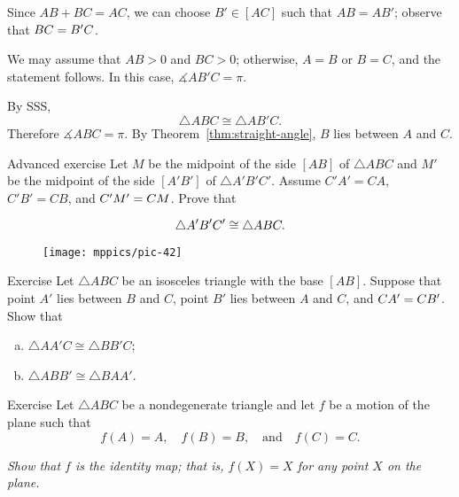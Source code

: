 Since $AB+BC=AC$, we can choose $B'\in [AC]$ such that $AB=AB'$;
observe that $BC\z=B'C$.

We may assume that $AB>0$ and $BC>0$;
otherwise, $A=B$ or $B=C$, and the statement follows.
In this case, $\measuredangle AB'C=\pi$.

By SSS, 
\[\triangle ABC\cong \triangle AB'C.\]
Therefore $\measuredangle ABC=\pi$.
By Theorem~\ref{thm:straight-angle}, $B$ lies between $A$ and $C$.
\qeds



\begin{thm}{Advanced exercise}\label{ex:SMS}
Let $M$ be the midpoint of the side $[A B]$ of $\triangle A B C$ and
$M'$ be the midpoint of the side $[A' B']$ of $\triangle A' B' C'$.
Assume $C' A'=C A$, $C' B'= C B$, and $C' M'\z= C M$.
Prove that

\[\triangle A' B' C'\z\cong\triangle A B C.\]

\end{thm}

{

\begin{wrapfigure}[6]{r}{26mm}
\vskip-0mm
\centering
\texttt{[image: mppics/pic-42]}
\end{wrapfigure}

\begin{thm}{Exercise}\label{ex:isos-sides}
Let $\triangle A B C$ be an isosceles triangle with the base $[A B]$.
Suppose that point $A'$ lies between $B$ and $C$,
point $B'$ lies between $A$ and $C$,
and $C A'\z=C B'$.
Show that
\begin{enumerate}[(a)]
\item $\triangle A A' C\cong \triangle B B' C$;
\item $\triangle A B B'\cong \triangle B A A'$.
\end{enumerate}

\end{thm}

\begin{thm}{Exercise}\label{ex:ABC-motion}
Let $\triangle ABC$ be a nondegenerate triangle and 
let $f$ be a motion of the plane 
such that 
$$f(A)=A,
\quad 
f(B)=B,
\quad 
\text{and}
\quad
f(C)=C.$$

\end{thm}

}

\vskip-2mm
\textit{Show that $f$ is the identity map;
that is, $f(X)=X$ for any point $X$ on the plane.}



